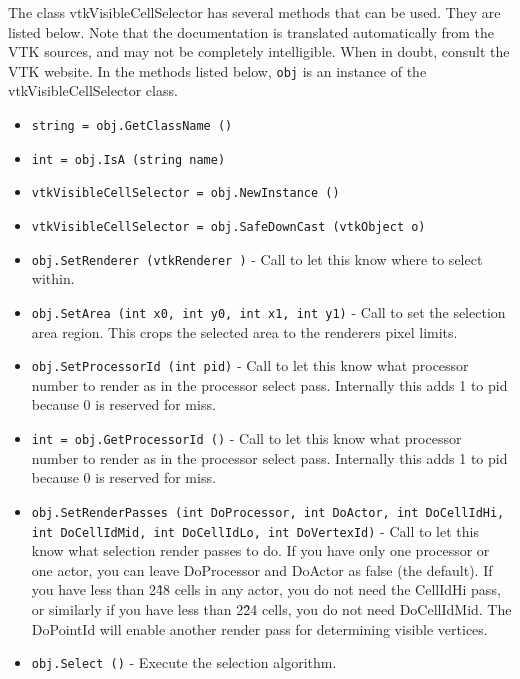 The class vtkVisibleCellSelector has several methods that can be used.
  They are listed below.
Note that the documentation is translated automatically from the VTK sources,
and may not be completely intelligible.  When in doubt, consult the VTK website.
In the methods listed below, \verb|obj| is an instance of the vtkVisibleCellSelector class.
\begin{itemize}
\item  \verb|string = obj.GetClassName ()|

\item  \verb|int = obj.IsA (string name)|

\item  \verb|vtkVisibleCellSelector = obj.NewInstance ()|

\item  \verb|vtkVisibleCellSelector = obj.SafeDownCast (vtkObject o)|

\item  \verb|obj.SetRenderer (vtkRenderer )| -  Call to let this know where to select within.

\item  \verb|obj.SetArea (int x0, int y0, int x1, int y1)| -  Call to set the selection area region.
 This crops the selected area to the renderers pixel limits.

\item  \verb|obj.SetProcessorId (int pid)| -  Call to let this know what processor number to render as in the processor
 select pass. Internally this adds 1 to pid because 0 is reserved for miss.

\item  \verb|int = obj.GetProcessorId ()| -  Call to let this know what processor number to render as in the processor
 select pass. Internally this adds 1 to pid because 0 is reserved for miss.

\item  \verb|obj.SetRenderPasses (int DoProcessor, int DoActor, int DoCellIdHi, int DoCellIdMid, int DoCellIdLo, int DoVertexId)| -  Call to let this know what selection render passes to do.
 If you have only one processor or one actor, you can leave DoProcessor 
 and DoActor as false (the default). If you have less than 2\^48 cells in 
 any actor, you do not need the CellIdHi pass, or similarly if you have 
 less than 2\^24 cells, you do not need DoCellIdMid.
 The DoPointId will enable another render pass for determining visible
 vertices.

\item  \verb|obj.Select ()| -  Execute the selection algorithm.


\end{itemize}
